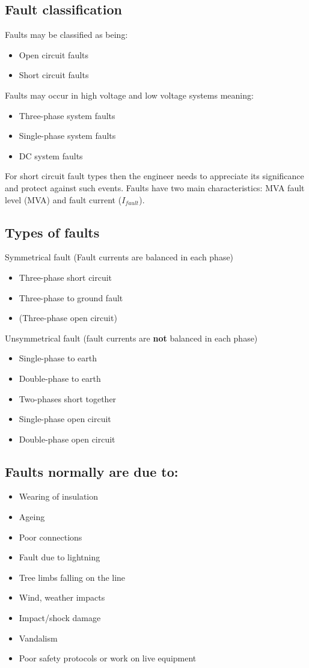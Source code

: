 \subsection{Fault classification}
Faults may be classified as being:
\begin{itemize}
	\item Open circuit faults
	\item Short circuit faults
\end{itemize}
Faults may occur in high voltage and low voltage systems meaning:
\begin{itemize}
	\item Three-phase system faults
	\item Single-phase system faults
	\item DC system faults
\end{itemize}
For short circuit fault types then the engineer needs to appreciate its significance and protect against such events. Faults have two main characteristics: MVA fault level (\si{MVA}) and fault current ($I_{fault}$).
\subsection{Types of faults}
Symmetrical fault (Fault currents are balanced in each phase)
\begin{itemize}
	\item Three-phase short circuit
	\item Three-phase to ground fault
	\item (Three-phase open circuit)
\end{itemize}
Unsymmetrical fault (fault currents are \textbf{not} balanced in each phase)
\begin{itemize}
	\item Single-phase to earth
	\item Double-phase to earth
	\item Two-phases short together
	\item Single-phase open circuit
	\item Double-phase open circuit
\end{itemize}
\subsection{Faults normally are due to:}
\begin{itemize}
	\item Wearing of insulation
	\item Ageing
	\item Poor connections
	\item Fault due to lightning
	\item Tree limbs falling on the line
	\item Wind, weather impacts
	\item Impact/shock damage
	\item Vandalism
	\item Poor safety protocols or work on live equipment
\end{itemize}
